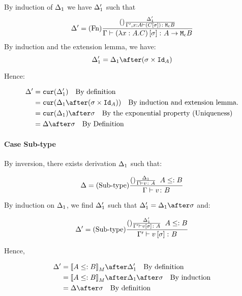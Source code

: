 {    By induction of $\Delta_1$ we have $\Delta_1'$ such that
    \begin{equation}
        \Delta' = (\text{Fn}) \frac{
            (\text{}) \frac{\Delta_1'}{\Gamma', x:A \vdash (C\left[\sigma\right]) \colon \texttt{M}_{\epsilon}{B}}
        }{\Gamma \vdash (\lambda x : A. C)\left[\sigma\right] \colon A \rightarrow \texttt{M}_{\epsilon}{B}}
    \end{equation}
    By induction and the extension lemma, we have:
    \begin{equation}
        \D_1' = \D_1\after(\si\times\Id{A})
    \end{equation}

    Hence:

    \begin{align}
        \D' &= \cur{\D_1'}\qt{By definition}\\
            &= \cur{\D_1\after(\si\times\Id{A})}\qt{By induction and extension lemma.}\\
            & = \cur{\D_1}\after\si\qt{By the exponential property (Uniqueness)}\\
            &= \D\after\si\qt{By Definition}\\
    \end{align}
    \paragraph{Case Sub-type}
    By inversion, there exists derivation $\Delta_1$ such that:

    \begin{equation}
        \Delta = (\text{Sub-type}) \frac{(\text{}) \frac{\Delta_1}{\Gamma \vdash v \colon A}\;\; A\leq: B}{\Gamma \vdash v \colon B}
    \end{equation}

    By induction on $\Delta_1$, we find $\Delta_1'$ such that $\D_1' = \D_1\after\si$ and:

    \begin{equation}
        \Delta' = (\text{Sub-type}) \frac{(\text{}) \frac{\Delta_1'}{\Gamma' \vdash v\left[\sigma\right] \colon A}\;\; A\leq: B}{\Gamma' \vdash v\left[\sigma\right] \colon B}
    \end{equation}

    Hence,

    \begin{align}
        \D' &= \deno{A\subtype B}\after\D_1'\qt{By definition}\\
            &= \deno{A\subtype B}\after\D_1\after\si\qt{By induction}\\
            &= \D\after\si\qt{By definition}\\
    \end{align}
}
